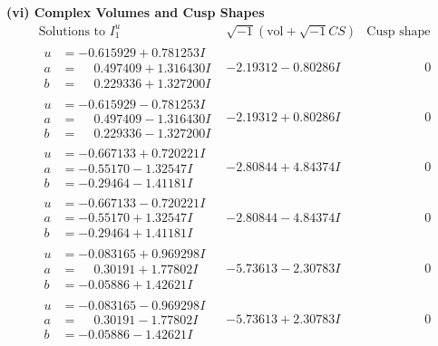 \documentclass[1p]{elsarticle_modified}
\theoremstyle{definition}
\newcommand{\I}{\sqrt{-1}}
\begin{document}
\newpage\flushleft \textbf{(vi) Complex Volumes and Cusp Shapes}
$$\begin{array}{c|c|c}  
\text{Solutions to }I^u_{1}& \I (\text{vol} + \sqrt{-1}CS) & \text{Cusp shape}\\
 \hline 
\begin{aligned}
u &= -0.615929 + 0.781253 I \\
a &= \phantom{-}0.497409 + 1.316430 I \\
b &= \phantom{-}0.229336 + 1.327200 I\end{aligned}
 & -2.19312 - 0.80286 I & \phantom{-0.000000 } 0 \\ \hline\begin{aligned}
u &= -0.615929 - 0.781253 I \\
a &= \phantom{-}0.497409 - 1.316430 I \\
b &= \phantom{-}0.229336 - 1.327200 I\end{aligned}
 & -2.19312 + 0.80286 I & \phantom{-0.000000 } 0 \\ \hline\begin{aligned}
u &= -0.667133 + 0.720221 I \\
a &= -0.55170 - 1.32547 I \\
b &= -0.29464 - 1.41181 I\end{aligned}
 & -2.80844 + 4.84374 I & \phantom{-0.000000 } 0 \\ \hline\begin{aligned}
u &= -0.667133 - 0.720221 I \\
a &= -0.55170 + 1.32547 I \\
b &= -0.29464 + 1.41181 I\end{aligned}
 & -2.80844 - 4.84374 I & \phantom{-0.000000 } 0 \\ \hline\begin{aligned}
u &= -0.083165 + 0.969298 I \\
a &= \phantom{-}0.30191 + 1.77802 I \\
b &= -0.05886 + 1.42621 I\end{aligned}
 & -5.73613 - 2.30783 I & \phantom{-0.000000 } 0 \\ \hline\begin{aligned}
u &= -0.083165 - 0.969298 I \\
a &= \phantom{-}0.30191 - 1.77802 I \\
b &= -0.05886 - 1.42621 I\end{aligned}
 & -5.73613 + 2.30783 I & \phantom{-0.000000 } 0 \\ \hline\begin{aligned}

\end{aligned}
\end{array}$$
\end{document}
